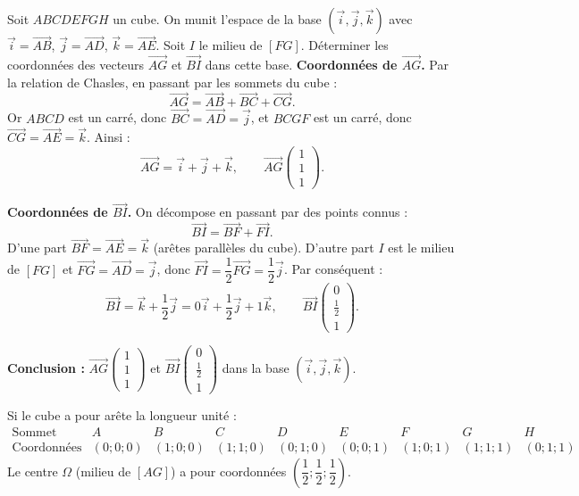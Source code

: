 \documentclass[11pt]{article}
\begin{document}
\begin{exoresolu}
Soit $ABCDEFGH$ un cube. On munit l'espace de la base $(\vec{i},\vec{j},\vec{k})$ avec $\vec{i}=\overrightarrow{AB}$, $\vec{j}=\overrightarrow{AD}$, $\vec{k}=\overrightarrow{AE}$. Soit $I$ le milieu de $[FG]$. Déterminer les coordonnées des vecteurs $\overrightarrow{AG}$ et $\overrightarrow{BI}$ dans cette base.
\tcblower
\textbf{Coordonnées de $\overrightarrow{AG}$.} Par la relation de Chasles, en passant par les sommets du cube :
\[ \overrightarrow{AG}=\overrightarrow{AB}+\overrightarrow{BC}+\overrightarrow{CG}. \]
Or $ABCD$ est un carré, donc $\overrightarrow{BC}=\overrightarrow{AD}=\vec{j}$, et $BCGF$ est un carré, donc $\overrightarrow{CG}=\overrightarrow{AE}=\vec{k}$. Ainsi :
\[ \overrightarrow{AG}=\vec{i}+\vec{j}+\vec{k}, \qquad \overrightarrow{AG}\begin{pmatrix} 1 \\ 1 \\ 1 \end{pmatrix}. \]

\textbf{Coordonnées de $\overrightarrow{BI}$.} On décompose en passant par des points connus :
\[ \overrightarrow{BI}=\overrightarrow{BF}+\overrightarrow{FI}. \]
D'une part $\overrightarrow{BF}=\overrightarrow{AE}=\vec{k}$ (arêtes parallèles du cube). D'autre part $I$ est le milieu de $[FG]$ et $\overrightarrow{FG}=\overrightarrow{AD}=\vec{j}$, donc $\overrightarrow{FI}=\dfrac{1}{2}\overrightarrow{FG}=\dfrac{1}{2}\vec{j}$. Par conséquent :
\[ \overrightarrow{BI}=\vec{k}+\frac{1}{2}\vec{j}=0\vec{i}+\frac{1}{2}\vec{j}+1\vec{k}, \qquad \overrightarrow{BI}\begin{pmatrix} 0 \\ \frac{1}{2} \\ 1 \end{pmatrix}. \]

\textbf{Conclusion :} $\overrightarrow{AG}\begin{pmatrix} 1 \\ 1 \\ 1 \end{pmatrix}$ et $\overrightarrow{BI}\begin{pmatrix} 0 \\ \frac{1}{2} \\ 1 \end{pmatrix}$ dans la base $(\vec{i},\vec{j},\vec{k})$.
\end{exoresolu}

\begin{aretenir}
Si le cube a pour arête la longueur unité :
\[
\begin{array}{c|cccccccc}
\text{Sommet} & A & B & C & D & E & F & G & H \\ \hline
\text{Coordonnées} & (0;0;0) & (1;0;0) & (1;1;0) & (0;1;0) & (0;0;1) & (1;0;1) & (1;1;1) & (0;1;1)
\end{array}
\]
Le centre $\Omega$ (milieu de $[AG]$) a pour coordonnées $\left(\dfrac{1}{2};\dfrac{1}{2};\dfrac{1}{2}\right)$.
\end{aretenir}
\end{document}
